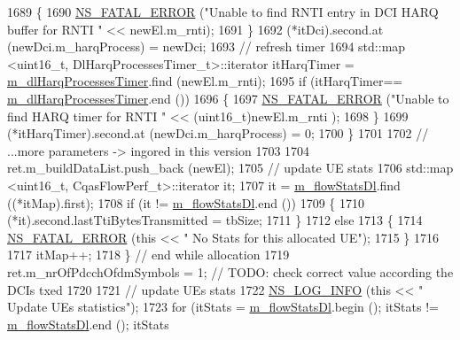 \begin{DoxyCode}
1689             \{
1690               \hyperlink{group__fatal_ga5131d5e3f75d7d4cbfd706ac456fdc85}{NS\_FATAL\_ERROR} (\textcolor{stringliteral}{"Unable to find RNTI entry in DCI HARQ buffer for RNTI "} << 
      newEl.m\_rnti);
1691             \}
1692           (*itDci).second.at (newDci.m\_harqProcess) = newDci;
1693           \textcolor{comment}{// refresh timer}
1694           std::map <uint16\_t, DlHarqProcessesTimer\_t>::iterator itHarqTimer =  
      \hyperlink{classns3_1_1CqaFfMacScheduler_a2e130ab374b4770c3544495ba593f023}{m\_dlHarqProcessesTimer}.find (newEl.m\_rnti);
1695           \textcolor{keywordflow}{if} (itHarqTimer== \hyperlink{classns3_1_1CqaFfMacScheduler_a2e130ab374b4770c3544495ba593f023}{m\_dlHarqProcessesTimer}.end ())
1696             \{
1697               \hyperlink{group__fatal_ga5131d5e3f75d7d4cbfd706ac456fdc85}{NS\_FATAL\_ERROR} (\textcolor{stringliteral}{"Unable to find HARQ timer for RNTI "} << (uint16\_t)newEl.m\_rnti
      );
1698             \}
1699           (*itHarqTimer).second.at (newDci.m\_harqProcess) = 0;
1700         \}
1701 
1702       \textcolor{comment}{// ...more parameters -> ingored in this version}
1703 
1704       ret.m\_buildDataList.push\_back (newEl);
1705       \textcolor{comment}{// update UE stats}
1706       std::map <uint16\_t, CqasFlowPerf\_t>::iterator it;
1707       it = \hyperlink{classns3_1_1CqaFfMacScheduler_a1cf6c47e55cbcfb9c28b17c242bde972}{m\_flowStatsDl}.find ((*itMap).first);
1708       \textcolor{keywordflow}{if} (it != \hyperlink{classns3_1_1CqaFfMacScheduler_a1cf6c47e55cbcfb9c28b17c242bde972}{m\_flowStatsDl}.end ())
1709         \{
1710           (*it).second.lastTtiBytesTransmitted = tbSize;
1711         \}
1712       \textcolor{keywordflow}{else}
1713         \{
1714           \hyperlink{group__fatal_ga5131d5e3f75d7d4cbfd706ac456fdc85}{NS\_FATAL\_ERROR} (\textcolor{keyword}{this} << \textcolor{stringliteral}{" No Stats for this allocated UE"});
1715         \}
1716 
1717       itMap++;
1718     \} \textcolor{comment}{// end while allocation}
1719   ret.m\_nrOfPdcchOfdmSymbols = 1;   \textcolor{comment}{// TODO: check correct value according the DCIs txed}
1720 
1721   \textcolor{comment}{// update UEs stats}
1722   \hyperlink{group__logging_gafbd73ee2cf9f26b319f49086d8e860fb}{NS\_LOG\_INFO} (\textcolor{keyword}{this} << \textcolor{stringliteral}{" Update UEs statistics"});
1723   \textcolor{keywordflow}{for} (itStats = \hyperlink{classns3_1_1CqaFfMacScheduler_a1cf6c47e55cbcfb9c28b17c242bde972}{m\_flowStatsDl}.begin (); itStats != \hyperlink{classns3_1_1CqaFfMacScheduler_a1cf6c47e55cbcfb9c28b17c242bde972}{m\_flowStatsDl}.end (); itStats

\end{DoxyCode}
